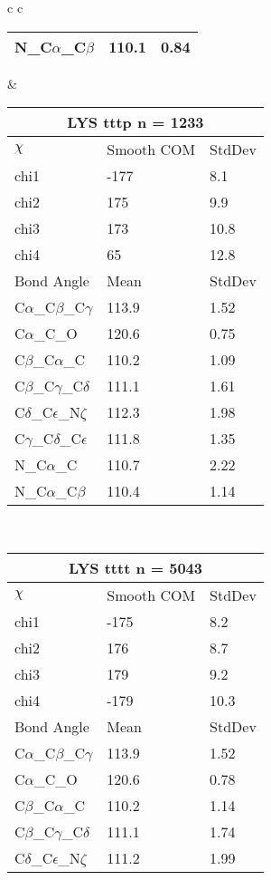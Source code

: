 \begin{longtable}{ c c }
\begin{tabular}{ l l l }
  N\_C$\alpha$\_C$\beta$ & 110.1 & 0.84\\
  \bottomrule
  \end{tabular}
  &
  \begin{tabular}{ l l l }
  \toprule
  \multicolumn{3}{c}{LYS \textbf{tttp} n = 1233} \\ \toprule
  $\chi$       & Smooth COM & StdDev \\ \midrule
  chi1 & -177 & 8.1 \\ 
  chi2 & 175 & 9.9 \\ 
  chi3 & 173 & 10.8 \\ 
  chi4 & 65 & 12.8 \\ \midrule
  Bond Angle   & Mean     & StdDev \\ \midrule
  C$\alpha$\_C$\beta$\_C$\gamma$ & 113.9 & 1.52\\
  C$\alpha$\_C\_O & 120.6 & 0.75\\
  C$\beta$\_C$\alpha$\_C & 110.2 & 1.09\\
  C$\beta$\_C$\gamma$\_C$\delta$ & 111.1 & 1.61\\
  C$\delta$\_C$\epsilon$\_N$\zeta$ & 112.3 & 1.98\\
  C$\gamma$\_C$\delta$\_C$\epsilon$ & 111.8 & 1.35\\
  N\_C$\alpha$\_C & 110.7 & 2.22\\
  N\_C$\alpha$\_C$\beta$ & 110.4 & 1.14\\
  \bottomrule
  \end{tabular}
  \\
  \begin{tabular}{ l l l }
  \toprule
  \multicolumn{3}{c}{LYS \textbf{tttt} n = 5043} \\ \toprule
  $\chi$       & Smooth COM & StdDev \\ \midrule
  chi1 & -175 & 8.2 \\ 
  chi2 & 176 & 8.7 \\ 
  chi3 & 179 & 9.2 \\ 
  chi4 & -179 & 10.3 \\ \midrule
  Bond Angle   & Mean     & StdDev \\ \midrule
  C$\alpha$\_C$\beta$\_C$\gamma$ & 113.9 & 1.52\\
  C$\alpha$\_C\_O & 120.6 & 0.78\\
  C$\beta$\_C$\alpha$\_C & 110.2 & 1.14\\
  C$\beta$\_C$\gamma$\_C$\delta$ & 111.1 & 1.74\\
  C$\delta$\_C$\epsilon$\_N$\zeta$ & 111.2 & 1.99\\

\end{tabular}
\end{longtable}
